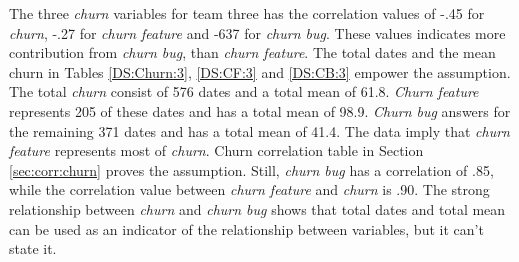 \documentclass[UKenglish]{ifimaster}  %
\begin{document}
The three \textit{churn} variables for team three has the correlation values of -.45 for \textit{churn}, -.27 for \textit{churn feature} and -637 for \textit{churn bug}. These values indicates more contribution from \textit{churn bug}, than \textit{churn feature}. The total dates and the mean churn in Tables \ref{DS:Churn:3}, \ref{DS:CF:3} and \ref{DS:CB:3} empower the assumption. The total \textit{churn} consist of 576 dates and a total mean of 61.8. \textit{Churn feature}  represents 205 of these dates and has a total mean of 98.9. \textit{Churn bug} answers for the remaining 371 dates and has a total mean of 41.4. The data imply that \textit{churn feature} represents most of \textit{churn}. Churn correlation table in Section \ref{sec:corr:churn} proves the assumption. Still,  \textit{churn bug} has a correlation of .85, while the correlation value between \textit{churn feature} and \textit{churn} is .90. The strong relationship between \textit{churn} and \textit{churn bug} shows that total dates and total mean can be used as an indicator of the relationship between variables, but it can't state it.
\end{document}
